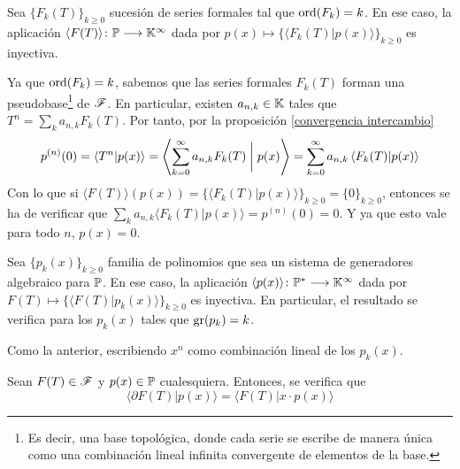 \begin{proposicion}\label{inyectividad sucesion F_k}
    Sea $\{ F_k(T) \}_{k\geq0}$ sucesión de series formales tal que $\operatorname*{ord}(F_k) = k$. En ese caso, la aplicación $\langle F(T) \rangle \colon \mathbb{P} \longrightarrow \mathbb{K}^\infty$ dada por $p(x) \mapsto \{ \langle F_k(T) | p(x) \rangle \}_{k \geq 0}$ es inyectiva.
\end{proposicion}
\begin{demo}
    Ya que $\operatorname*{ord}(F_k) = k$, sabemos que las series formales $F_k(T)$ forman una pseudobase\footnote{Es decir, una base topológica, donde cada serie se escribe de manera única como una combinación lineal infinita convergente de elementos de la base.} de $\mathscr{F}$. En particular, existen $a_{n,k} \in \mathbb{K}$ tales que $T^n = \sum_{k} a_{n,k}F_k(T)$. Por tanto, por la proposición \ref{convergencia intercambio}
    \begin{equation*}
        p^{(n)}(0) = \langle T^n | p(x) \rangle = \left\langle \sum_{k=0}^\infty a_{n,k}F_k(T) \biggm| p(x) \right\rangle = \sum_{k=0}^\infty a_{n,k} \left\langle F_k(T) | p(x) \right\rangle
    \end{equation*}
    Con lo que si $ \langle F(T) \rangle(p(x)) =\{  \langle F_k(T) | p(x) \rangle \}_{k \geq 0} = \{ 0 \}_{k \geq 0}$, entonces se ha de verificar que $\sum_{k} a_{n,k} \langle F_k(T) | p(x) \rangle = p^{(n)}(0) = 0$. Y ya que esto vale para todo $n$, $p(x) = 0$.
\end{demo}

\begin{proposicion}
    Sea $\{p_k(x)\}_{k \geq 0}$ familia de polinomios que sea un sistema de generadores algebraico para $\mathbb{P}$. En ese caso, la aplicación $ \langle p(x) \rangle \colon  \mathbb{P}^* \longrightarrow \mathbb{K}^\infty$ dada por $F(T) \mapsto \{  \langle F(T) | p_k(x) \rangle \}_{k \geq 0}$
    es inyectiva. En particular, el resultado se verifica para los $p_k(x)$ tales que $\operatorname{gr}(p_k) = k$. 
\end{proposicion}
\begin{demo}
    Como la anterior, escribiendo $x^n$ como combinación lineal de los $p_k(x)$. 
\end{demo}

\begin{proposicion}\label{adjuncion M}
    Sean $F(T) \in \mathscr{F}$ y $p(x) \in \mathbb{P}$ cualesquiera. Entonces, se verifica que
    \begin{equation*}
        \langle \partial F(T) | p(x) \rangle = \langle F(T) | x \cdot p(x)\rangle
    \end{equation*}
\end{proposicion}

